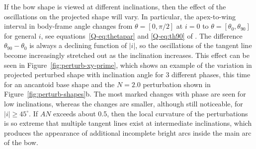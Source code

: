 If the bow shape is viewed at different inclinations, then the effect
of the oscillations on the projected shape will vary.  In particular,
the apex-to-wing interval in body-frame angle changes from
\(\theta = [0, \pi/2]\) at \(i = 0\) to
\(\theta = [\theta_0, \theta_{90}]\) for general \(i\), see
equations~\eqref{Q-eq:thetapar} and \eqref{Q-eq:th90} of \PaperI{}.
The difference \(\theta_{90} - \theta_0\) is always a declining function of
\(|i|\), so the oscillations of the tangent line become increasingly
stretched out as the inclination increases.  This effect can be seen
in Figure~\ref{fig:perturb-xy-prime}, which shows an example of the
variation in projected perturbed shape with inclination angle for 3
different phases, this time for an ancantoid base shape and the
\(N = 2.0\) perturbation shown in Figure~\ref{fig:perturb-shapes}b.
The most marked changes with phase are seen for low inclinations,
whereas the changes are smaller, although still noticeable, for
\(|i| \ge 45^\circ\). If \(A N\) exceeds about 0.5, then the local curvature
of the perturbations is so extreme that multiple tangent lines exist
at intermediate inclinations, which produces the appearance of
additional incomplete bright arcs inside the main arc of the bow.


